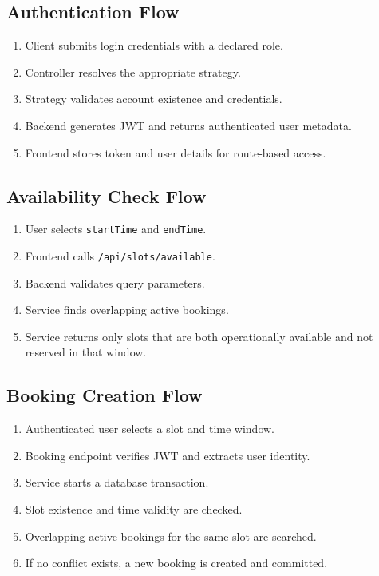 \documentclass[12pt,a4paper]{article}
\begin{document}
\subsection{Authentication Flow}
\begin{enumerate}
    \item Client submits login credentials with a declared role.
    \item Controller resolves the appropriate strategy.
    \item Strategy validates account existence and credentials.
    \item Backend generates JWT and returns authenticated user metadata.
    \item Frontend stores token and user details for route-based access.
\end{enumerate}

\subsection{Availability Check Flow}
\begin{enumerate}
    \item User selects \texttt{startTime} and \texttt{endTime}.
    \item Frontend calls \texttt{/api/slots/available}.
    \item Backend validates query parameters.
    \item Service finds overlapping active bookings.
    \item Service returns only slots that are both operationally available and not reserved in that window.
\end{enumerate}

\subsection{Booking Creation Flow}
\begin{enumerate}
    \item Authenticated user selects a slot and time window.
    \item Booking endpoint verifies JWT and extracts user identity.
    \item Service starts a database transaction.
    \item Slot existence and time validity are checked.
    \item Overlapping active bookings for the same slot are searched.
    \item If no conflict exists, a new booking is created and committed.
\end{enumerate}
\end{document}
